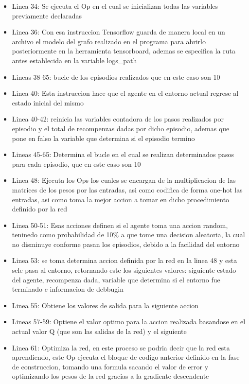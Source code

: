 \begin{itemize}
    \item Linea 34: Se ejecuta el Op en el cual se inicializan todas las variables previamente declaradas
    \item Linea 36: Con esa instruccion Tensorflow guarda de manera local en un archivo el modelo del grafo realizado en el programa para abrirlo posteriormente en la herramienta tensorboard, ademas se especifica la ruta antes establecida en la variable logs\_path
	\item Lineas 38-65: bucle de los episodios realizados que en este caso son 10
	\item Linea 40: Esta instruccion hace que el agente en el entorno actual regrese al estado inicial del mismo
	\item Linea 40-42: reinicia las variables contadora de los pasos realizados por episodio y el total de recompenzas dadas por dicho episodio, ademas que pone en falso la variable que determina si el episodio termino
	\item Lineas 45-65: Determina el bucle en el cual se realizan determinados pasos para cada episodio, que en este caso son 10
	\item Linea 48: Ejecuta los Ops los cuales se encargan de la multiplicacion de las matrices de los pesos por las entradas, asi como codifica de forma one-hot las entradas, asi como toma la mejor accion a tomar en dicho procedimiento definido por la red
	\item Linea 50-51: Esas acciones definen si el agente toma una accion random, teninedo como probabilidad de 10\% a que tome una decision aleatoria, la cual no disminuye conforme pasan los episodios, debido a la facilidad del entorno
	\item Linea 53: se toma determina accion definida por la red en la linea 48 y esta sele pasa al entorno, retornando este los siguientes valores: siguiente estado del agente, recompenza dada, variable que determina si el entorno fue terminado e informacion de debbugin
	\item Linea 55: Obtiene los valores de salida para la siguiente accion
	\item Lineas 57-59: Optiene el valor optimo para la accion realizada basandose en el actual valor Q (que son las salidas de la red) y el siguiente
	\item Linea 61: Optimiza la red, en este proceso se podria decir que la red esta aprendiendo, este Op ejecuta el bloque de codigo anterior definido en la fase de construccion, tomando una formula sacando el valor de error y optimizando los pesos de la red gracias a la gradiente descendente

\end{itemize}
